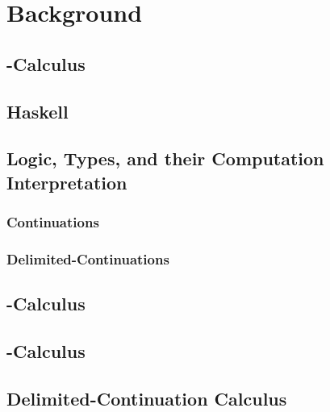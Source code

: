 \chapter{Background}

\section{\lam-Calculus}

\section{Haskell}

\section{Logic, Types, and their Computation Interpretation}
\subsection{Continuations}
\subsection{Delimited-Continuations}

\section{\lmu-Calculus}

\section{\ltry-Calculus}

\section{Delimited-Continuation Calculus}
